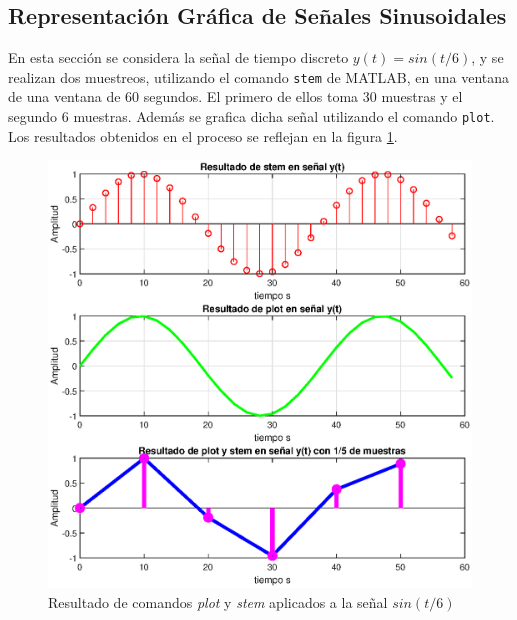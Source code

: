 \subsection{Representación Gráfica de Señales Sinusoidales}

En esta sección se considera la señal de tiempo discreto $y(t) = sin(t/6)$, y se realizan dos muestreos, utilizando el comando \texttt{stem} de MATLAB, en una ventana de una ventana de 60 segundos. El primero de ellos toma 30 muestras y el segundo 6 muestras. Además se grafica dicha señal utilizando el comando \texttt{plot}. Los resultados obtenidos en el proceso se reflejan en la figura \ref{plot_stem}.

\begin{figure}[H]
    \centering
    \includegraphics[scale = 0.8]{Imagenes/representacion_sennales.eps}
    \caption{Resultado de  comandos \textit{plot} y \textit{stem} aplicados a la señal $sin(t/6)$ }
    \label{plot_stem}
\end{figure}




